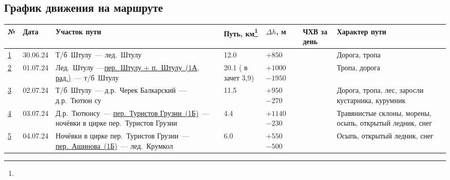 	\subsection{График движения на маршруте}
		{\footnotesize
		\begin{longtable}{|A|B|C|B|B|D|E|} \hline
			№							&	Дата 		&	Участок пути																																																&	Путь, км\footnote{\textOne}	&	$\Delta h$, м		&	ЧХВ	за день	&	Характер пути																\\ \hline
			\hyperref[subsec:Day1]{1}	&	30.06.24	&	Т/б~Штулу~--- лед.~Штулу																																													&	12.0						&	$+850$ 			&			&	Дорога, тропа																\\ \hline
			\hyperref[subsec:Day2]{2}	&	01.07.24	&	Лед.~Штулу~---\hyperref[subsec:main_obstacles]{пер.~Штулу + п.~Штулу~(1А, рад.)}~--- т/б~Штулу																											&	20.1 ( в зачет 3,9)						&	$+1000$ $-1950$			&			&	Тропа, дорога																\\ \hline
			\hyperref[subsec:Day3]{3}	&	02.07.24	&	Т/б~Штулу~--- д.р.~Черек Балкарский~--- д.р.~Тютюн	су																																						&	11.5						&	$+950$ $-270$			&			&	Дорога, тропа, лес, заросли кустарника, курумник							\\ \hline
			\hyperref[subsec:Day4]{4}	&	03.07.24	&	Д.р.~Тютюнсу~--- \hyperref[subsec:main_obstacles]{пер.~Туристов Грузии~(1Б)}~--- ночёвки в цирке пер.~Туристов Грузии																						&	4.4							&	$+1140$ $-230$ 			&			&	Травянистые склоны, морены, осыпь, открытый ледник, снег					\\ \hline
			\hyperref[subsec:Day5]{5}	&	04.07.24	&	Ночёвки в цирке пер.~Туристов Грузии~--- \hyperref[subsec:main_obstacles]{пер.~Ашинова~(1Б)}~--- лед.~Крумкол																								&	6.0							&	$+550$ $-500$ 			&			&	Осыпь, открытый ледник, снег												\\ \hline

\end{longtable}}
